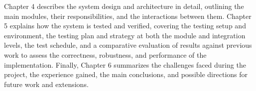 Chapter 4 describes the system design and architecture in detail, outlining the main modules, their responsibilities, and the interactions between them. Chapter 5 explains how the system is tested and verified, covering the testing setup and environment, the testing plan and strategy at both the module and integration levels, the test schedule, and a comparative evaluation of results against previous work to assess the correctness, robustness, and performance of the implementation. Finally, Chapter 6 summarizes the challenges faced during the project, the experience gained, the main conclusions, and possible directions for future work and extensions.
